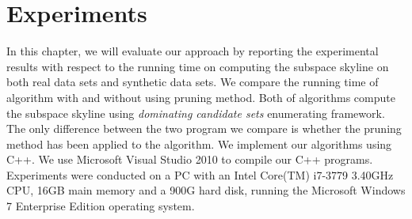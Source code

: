 
%
%

\chapter{Experiments}
\label{ch:exp}

In this chapter, we will evaluate our approach by reporting the experimental results with respect to the running time on computing the subspace skyline on both real data sets and synthetic data sets. We compare the running time of algorithm with and without using pruning method. Both of algorithms compute the subspace skyline using \emph{dominating candidate sets} enumerating framework. The only difference between the two program we compare is whether the pruning method has been applied to the algorithm.
We implement our algorithms using C++. We use Microsoft Visual Studio 2010 to compile our C++ programs. Experiments were conducted on a PC with an Intel Core(TM) i7-3779 3.40GHz CPU, 16GB main memory and a 900G hard disk, running the Microsoft Windows 7 Enterprise Edition operating system.

